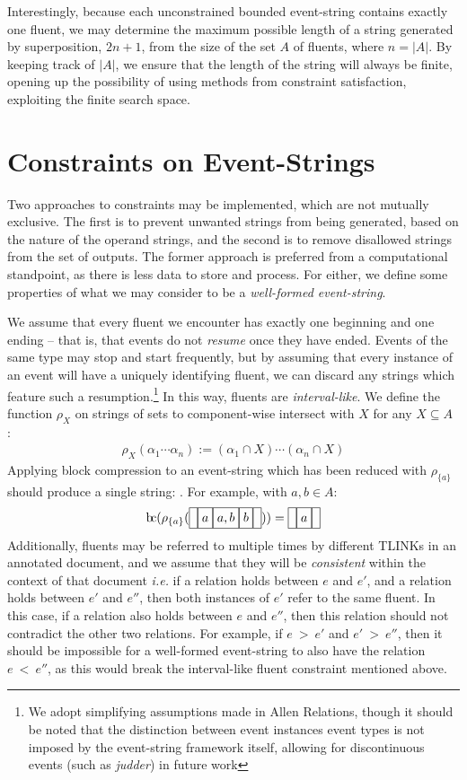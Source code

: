 \documentclass[a4paper,11pt,leqno]{article}
\makeatletter
\newcommand{\bc}{{\rm b\!c}}
\newcommand{\vph}[1]{\vphantom{#1}}
\newcommand{\ebox}[1]{\fbox{$\vph{',}#1$}}
\newcommand{\eboxb}[1]{\fbox{$\vph{@}#1$}}
\makeatother
\begin{document}
Interestingly, because each unconstrained bounded event-string 
\eboxb{}\eboxb{e}\eboxb{} contains exactly one fluent, we may determine the 
maximum possible length of a string generated by superposition, $2n + 1$, from 
the size of the set $A$ of fluents, where $n = |A|$. By keeping track of $|A|$, 
we ensure that the length of the string will always be finite, opening up the 
possibility of using methods from constraint satisfaction, exploiting the 
finite search space.

\section{Constraints on Event-Strings}\label{constraints}
Two approaches to constraints may be implemented, which are not mutually 
exclusive. The first is to prevent unwanted strings from being generated, based 
on the nature of the operand strings, and the second is to remove disallowed 
strings from the set of outputs. The former approach is preferred from a 
computational standpoint, as there is less data to store and process. For 
either, we define some properties of what we may consider to be a 
\textit{well-formed event-string}.

We assume that every fluent we encounter has exactly one beginning and one 
ending -- that is, that events do not \textit{resume} once they have ended. 
Events of the same type may stop and start frequently, but by assuming that 
every instance of an event will have a uniquely identifying fluent, we can 
discard any strings which feature such a resumption.\footnote{We adopt 
simplifying assumptions made in Allen Relations, though it should be noted that 
the distinction between event instances event types is not imposed by the 
event-string framework itself, allowing for discontinuous events (such as 
\textit{judder}) in future work} In this way, fluents are 
\textit{interval-like}. We define the function 
$\rho_{X}$ on strings of sets to component-wise intersect with $X$ for 
any $X 
\subseteq A$ \citep{fernando2016prior}:
\begin{align}
\rho_{X}(\alpha_1 \cdots \alpha_n) := (\alpha_1 \cap X) \cdots 
(\alpha_n 
\cap 
X)
\end{align}
Applying block compression to an event-string which has been reduced with 
$\rho_{\{a\}}$ should produce a single string: \eboxb{}\eboxb{a}\eboxb{}. For 
example, with $a, b \in A$:
\begin{align}
\bc{}(\rho_{\{a\}}(\ebox{}\ebox{a}\ebox{a, b}\ebox{b}\ebox{})) = 
\ebox{}\ebox{a}\ebox{}
\end{align}
Additionally, fluents may be referred to multiple times by different TLINKs in 
an annotated document, and we assume that they will be \textit{consistent} 
within the context of that document \textit{i.e.} if a relation holds between 
$e$ and $e'$, and a relation holds between $e'$ and $e''$, then both instances 
of $e'$ refer to the same fluent. In this case, if a relation also holds 
between $e$ and $e''$, then this relation should not contradict the other two 
relations. For example, if $e~>~e'$ and $e'~>~e''$, then it should be 
impossible for a well-formed event-string to also have the relation $e~<~e''$, 
as this would break the interval-like fluent constraint mentioned above.
\end{document}
